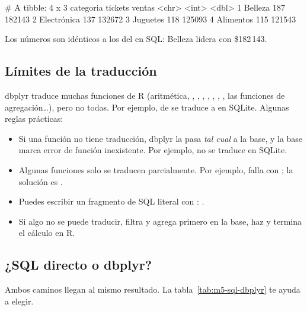 \begin{rsalida}
# A tibble: 4 x 3
  categoria   tickets ventas
  <chr>         <int>  <dbl>
1 Belleza         187 182143
2 Electrónica     137 132672
3 Juguetes        118 125093
4 Alimentos       115 121543
\end{rsalida}

Los números son idénticos a los del  en SQL: Belleza
lidera con \$182\,143.

\subsection{Límites de la traducción}

{\sloppy dbplyr traduce muchas funciones de R (aritmética, ,
, , ,
, , , las funciones de
agregación\ldots), pero no todas. Por ejemplo,  de 
se traduce a  en SQLite. Algunas reglas
prácticas:\par}

\begin{itemize}\sloppy
  \item Si una función no tiene traducción, dbplyr la pasa \emph{tal cual}
        a la base, y la base marca error de función inexistente. Por
        ejemplo,  no se traduce en SQLite.
  \item Algunas funciones solo se traducen parcialmente. Por ejemplo,
         falla con
        ;
        la solución es .
  \item Puedes escribir un fragmento de SQL literal con :
        .
  \item Si algo no se puede traducir, filtra y agrega primero en la base,
        haz  y termina el cálculo en R.
\end{itemize}

\subsection{¿SQL directo o dbplyr?}

Ambos caminos llegan al mismo resultado. La tabla~\ref{tab:m5-sql-dbplyr}
te ayuda a elegir.

